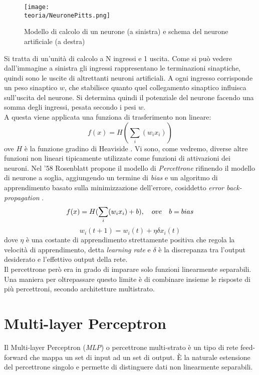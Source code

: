 \begin{figure}[h!]
 \centering
 \texttt{[image: \\teoria/NeuronePitts.png]}
 \caption{Modello di calcolo di un neurone (a sinistra) e schema del neurone artificiale (a destra)}
 \label{fig:neuron}
\end{figure}
Si tratta di un'unità di calcolo a N ingressi e 1 uscita. Come si può vedere dall'immagine a
sinistra gli ingressi rappresentano le terminazioni sinaptiche, quindi sono le uscite di altrettanti
neuroni artificiali. A ogni ingresso corrisponde un peso sinaptico $w$, che stabilisce quanto quel
collegamento sinaptico influisca sull'uscita del neurone. Si determina quindi il potenziale del neurone facendo una somma degli ingressi, pesata secondo i pesi $w$. \\
A questa viene applicata una funziona di trasferimento non lineare: 
\begin{equation}
 f(x) = H(\sum_{i}(w_i x_i))
\end{equation} 
ove $H$ è la funzione gradino di Heaviside \parencite{WHeaviside}. Vi sono, come vedremo, diverse altre funzioni non lineari tipicamente utilizzate come funzioni di attivazioni dei neuroni. 
Nel '58 Rosenblatt propone il modello di \emph{Percettrone} rifinendo il modello di neurone a soglia, aggiungendo un termine di \emph{bias} e un algoritmo di apprendimento basato sulla minimizzazione dell'errore, cosiddetto \emph{error back-propagation} \parencite{WPercettrone}.
\begin{equation}
 f(x) = H(\sum_{i}(w_i x_i)+b),\quad ove \quad b = bias \\
\end{equation}
\begin{equation} 
 w_i(t+1) = w_i(t)+\eta \delta x_i(t)
\end{equation}
dove $\eta$ è una costante di apprendimento strettamente positiva che regola la velocità di apprendimento, detta \emph{learning rate} e $\delta$ è la discrepanza tra l'output desiderato e l'effettivo output della rete. 
\\
Il percettrone però era in grado di imparare solo funzioni linearmente separabili. Una maniera per oltrepassare questo limite è di combinare insieme le risposte di più percettroni, secondo architetture multistrato. 

\section{Multi-layer Perceptron}
\label{sec:mlp}
Il Multi-layer Perceptron (\textit{MLP}) o percettrone multi-strato è un tipo di rete feed-forward che mappa un set di input ad un set di output. È la naturale estensione del percettrone singolo e permette di distinguere dati non linearmente separabili.




